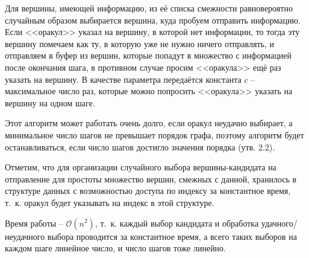 Для вершины, имеющей информацию, из её списка смежности равновероятно случайным образом выбирается вершина, куда пробуем отправить информацию. Если <<оракул>> указал на вершину, в которой нет информации, то тогда эту вершину помечаем как ту, в которую уже не нужно ничего отправлять, и отправляем в буфер из вершин, которые попадут в множество с информацией после окончания шага, в противном случае просим <<оракула>> ещё раз указать на вершину. В качестве параметра передаётся константа $c$ -- максимальное число раз, которые можно попросить <<оракула>> указать на вершину на одном шаге.

Этот алгоритм может работать очень долго, если оракул неудачно выбирает, а минимальное число шагов не превышает порядок графа, поэтому алгоритм будет останавливаться, если число шагов достигло значения порядка (утв. 2.2).

Отметим, что для организации случайного выбора вершины-кандидата на отправление для простоты множество вершин, смежных с данной, хранилось в структуре данных с возможностью доступа по индексу за константное время, т. к. оракул будет указывать на индекс в этой структуре.

Время работы – $\mathcal{O}(n^2)$, т. к. каждый выбор кандидата и обработка удачного/неудачного выбора проводится за константное время, а всего таких выборов на каждом шаге линейное число, и число шагов тоже линейно. 
